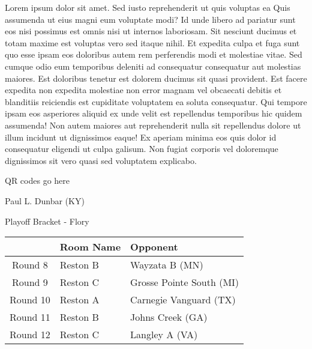 \documentclass{article}%
\begin{document}
\vspace*{8pt}%
\linebreak%
\newline%
\newline%
Lorem ipsum dolor sit amet. Sed iusto reprehenderit ut quis voluptas ea Quis assumenda ut eius magni eum voluptate modi? Id unde libero ad pariatur sunt eos nisi possimus est omnis nisi ut internos laboriosam. Sit nesciunt ducimus et totam maxime est voluptas vero sed itaque nihil. Et expedita culpa et fuga sunt quo esse ipsam eos doloribus autem rem perferendis modi et molestiae vitae.\newline%
\newline%
Sed cumque odio eum temporibus deleniti ad consequatur consequatur aut molestias maiores. Est doloribus tenetur est dolorem ducimus sit quasi provident. Est facere expedita non expedita molestiae non error magnam vel obcaecati debitis et blanditiis reiciendis est cupiditate voluptatem ea soluta consequatur. Qui tempore ipsam eos asperiores aliquid ex unde velit est repellendus temporibus hic quidem assumenda!\newline%
\newline%
Non autem maiores aut reprehenderit nulla sit repellendus dolore ut illum incidunt ut dignissimos eaque! Ex aperiam minima eos quis dolor id consequatur eligendi ut culpa galisum. Non fugiat corporis vel doloremque dignissimos sit vero quasi sed voluptatem explicabo.\newline%
\newline%
%
\vspace*{30pt}%
\begin{center}%
\begin{Huge}%
QR codes go here%
\end{Huge}%
\end{center}%
\newpage%
\begin{center}%
\begin{Huge}%
Paul L. Dunbar (KY)%
\end{Huge}%
\vspace*{8pt}%
\linebreak%
\begin{Large}%
Playoff Bracket {-} Flory%
\end{Large}%
\end{center}%
%
\begin{tabularx}{\textwidth}{|c|Y|Y|}%
\hline%
&Room Name&Opponent\\%
\hline%
Round 8&Reston B&Wayzata B (MN)\\%
Round 9&Reston C&Grosse Pointe South (MI)\\%
Round 10&Reston A&Carnegie Vanguard (TX)\\%
Round 11&Reston B&Johns Creek (GA)\\%
Round 12&Reston C&Langley A (VA)\\%
\hline%
\end{tabularx}%
\end{document}
